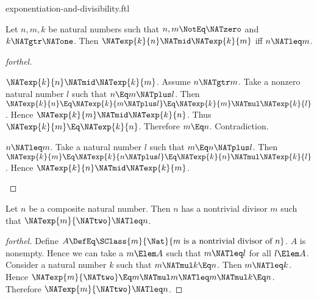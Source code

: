 \documentclass{stex}
\begin{document}
\begin{smodule}{exponentiation-and-divisibility.ftl}

\begin{proposition}[forthel]
  Let $n, m, k$ be natural numbers such that $n, m \NotEq \NATzero$ and $k \NATgtr \NATone$.
  Then $\NATexp{k}{n} \NATmid \NATexp{k}{m}$ iff $n \NATleq m$.
\end{proposition}
\begin{proof}[forthel]
  \begin{case}{$\NATexp{k}{n} \NATmid \NATexp{k}{m}$.}
    Assume $n \NATgtr m$.
    Take a nonzero natural number $l$ such that $n \Eq m \NATplus l$.
    Then $\NATexp{k}{n}
      \Eq \NATexp{k}{m \NATplus l}
      \Eq \NATexp{k}{m} \NATmul \NATexp{k}{l}$.
    Hence $\NATexp{k}{m} \NATmid \NATexp{k}{n}$.
    Thus $\NATexp{k}{m} \Eq \NATexp{k}{n}$.
    Therefore $m \Eq n$.
    Contradiction.
  \end{case}

  \begin{case}{$n \NATleq m$.}
    Take a natural number $l$ such that $m \Eq n \NATplus l$.
    Then $\NATexp{k}{m}
      \Eq \NATexp{k}{n \NATplus l}
      \Eq \NATexp{k}{n} \NATmul \NATexp{k}{l}$.
    Hence $\NATexp{k}{n} \NATmid \NATexp{k}{m}$.
  \end{case}
\end{proof}

\begin{proposition}[forthel]
  Let $n$ be a composite natural number.
  Then $n$ has a nontrivial divisor $m$ such that $\NATexp{m}{\NATtwo} \NATleq n$.
\end{proposition}
\begin{proof}[forthel]
  Define $A \DefEq \SClass{m}{\Nat}{m\text{ is a nontrivial divisor of }n}$.
  $A$ is nonempty.
  Hence we can take a $m \Elem A$ such that $m \NATleq l$ for all $l \Elem A$.
  Consider a natural number $k$ such that $m \NATmul k \Eq n$.
  Then $m \NATleq k$.
  Hence $\NATexp{m}{\NATtwo} \Eq m \NATmul m \NATleq m \NATmul k \Eq n$.
  Therefore $\NATexp{m}{\NATtwo} \NATleq n$.
\end{proof}
\end{smodule}
\end{document}
